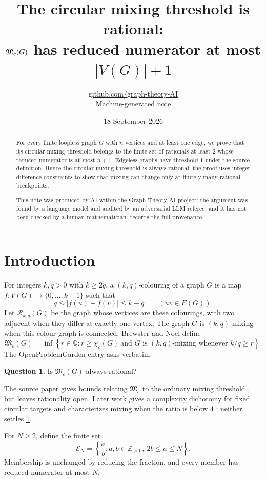 \documentclass[11pt,a4paper]{article}
\title{The circular mixing threshold is rational:\\ $\Mc(G)$ has reduced numerator at most $|V(G)|+1$}
\author{\href{https://github.com/graph-theory-AI}{github.com/graph-theory-AI}\\[2pt] \normalsize Machine-generated note}
\date{18 September 2026}
\theoremstyle{plain}
\theoremstyle{definition}
\newtheorem{question}[theorem]{Question}
\theoremstyle{remark}
\newcommand{\Z}{\mathbb Z}
\newcommand{\Q}{\mathbb Q}
\newcommand{\Mc}{\mathfrak M_c}
\newcommand{\cE}{\mathcal E}
\newcommand{\cR}{\mathcal R}
\newcommand{\chic}{\chi_c}
\begin{document}
\maketitle

\begin{abstract}
For every finite loopless graph $G$ with $n$ vertices and at least one edge, we prove
that its circular mixing threshold belongs to the finite set of rationals at least $2$
whose reduced numerator is at most $n+1$.  Edgeless graphs have threshold $1$ under the
source definition.  Hence the circular mixing threshold is always rational; the proof
uses integer difference constraints to show that mixing can change only at finitely many
rational breakpoints.

\medskip\noindent\small This note was produced by AI within
the \href{https://github.com/graph-theory-AI/Graph-Theory-LLM-Proofs}{Graph Theory AI}
project: the argument was found by a language model and audited by an adversarial LLM
referee, and it has not been checked by a human mathematician. 
records the full provenance.
\end{abstract}

\section{Introduction}

For integers $k,q>0$ with $k\ge2q$, a $(k,q)$-colouring of a graph $G$ is a map
$f:V(G)\to\{0,\ldots,k-1\}$ such that
\[
 q\le |f(u)-f(v)|\le k-q\qquad(uv\in E(G)).
\]
Let $\cR_{k,q}(G)$ be the graph whose vertices are these colourings, with two adjacent
when they differ at exactly one vertex.  The graph $G$ is $(k,q)$-mixing when this
colour graph is connected.  Brewster and Noel define \cite[Definition~1.2]{BN15}
\[
 \Mc(G)=\inf\left\{r\in\Q:
 r\ge\chic(G)\ \text{and $G$ is $(k,q)$-mixing whenever $k/q\ge r$}\right\}.
\]
The OpenProblemGarden entry \cite{OPG} asks verbatim:
\begin{question}\label{q:opg}
Is $\mathfrak M_c(G)$ always rational?
\end{question}

The source paper gives bounds relating $\Mc$ to the ordinary mixing threshold
\cite[Theorem~4.12]{BN15}, but leaves rationality open.  Later work gives a complexity
dichotomy for fixed circular targets \cite{BMMN16} and characterizes mixing when the
ratio is below $4$ \cite{BM23}; neither settles \cref{q:opg}.

For $N\ge2$, define the finite set
\[
 \cE_N=\left\{\frac ab:a,b\in\Z_{>0},\ 2b\le a\le N\right\}.
\]
Membership is unchanged by reducing the fraction, and every member has reduced
numerator at most $N$.
\end{document}

